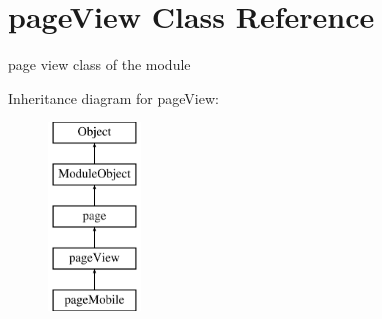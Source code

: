 \hypertarget{classpageView}{\section{page\-View Class Reference}
\label{classpageView}
}


page view class of the module  


Inheritance diagram for page\-View\-:\begin{figure}[H]
\begin{center}
\leavevmode
\includegraphics[height=5.000000cm]{classpageView}
\end{center}
\end{figure}
